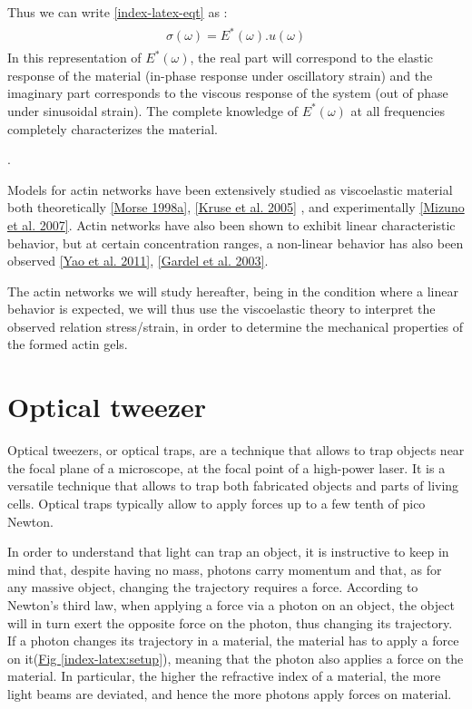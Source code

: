 \documentclass[A4paperpaper,11pt,english]{sphinxmanual}
\begin{document}
Thus we can write \eqref{index-latex-eqt} as :
\label{index-latex:equation-eqa17}\begin{gather}
\begin{split}\sigma(\omega) = E^*(\omega).u(\omega)\end{split}\label{index-latex-eqa17}
\end{gather}
In this representation of \(E^*(\omega)\), the real part will correspond to
the elastic response of the material (in-phase response
under oscillatory strain) and the imaginary part corresponds to the viscous response
of the system (out of phase under sinusoidal strain). The complete knowledge of
\(E^*(\omega)\) at all frequencies completely characterizes the material.

.

Models for actin networks have been extensively studied as viscoelastic material
both theoretically {\hyperref[index-latex:morse1998a]{{[}Morse  1998a{]}}}, {\hyperref[index-latex:kruse2005]{{[}Kruse et al. 2005{]}}} , and  experimentally
{\hyperref[index-latex:mizuno2007]{{[}Mizuno et al. 2007{]}}}. Actin networks have also been shown to exhibit linear characteristic behavior,
but at certain concentration ranges, a non-linear behavior has also been observed {\hyperref[index-latex:yao2011]{{[}Yao et al. 2011{]}}}, {\hyperref[index-latex:gardel2003]{{[}Gardel et al. 2003{]}}}.

The actin networks we will study hereafter, being in the condition where a linear behavior is expected, we will thus use the viscoelastic theory to interpret the
observed relation stress/strain, in order to determine the mechanical properties
of the formed actin gels.


\section{Optical tweezer}
\label{index-latex:id77}\label{index-latex:optical-tweezer}
Optical tweezers, or optical traps, are a technique that allows to trap objects
near the focal plane of a microscope, at the focal point of a high-power laser.
It is a versatile technique that allows to trap both fabricated objects and
parts of living cells. Optical traps typically allow to apply forces up to a few tenth of
pico Newton.

In order to understand that light can trap an object, it is instructive to keep in mind
that, despite having no mass, photons carry momentum and that, as for any massive
object, changing the trajectory requires a force.  According to Newton's third
law, when applying a force via a photon on an object, the object will in turn
exert the opposite force on the photon, thus changing its trajectory. If a photon changes its trajectory in a material, the material has to apply a
force on it(\hyperref[index-latex:setup]{Fig  \ref*{index-latex:setup}}), meaning that the photon also applies a force on the
material. In particular, the higher the refractive index of a material, the
more light beams are deviated, and hence the more photons apply forces on
material.
\end{document}
